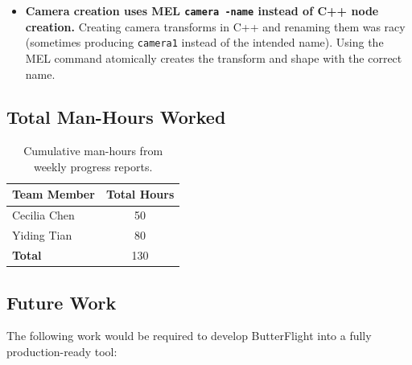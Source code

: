 \documentclass[12pt]{article}
\begin{document}
\begin{itemize}
  \item \textbf{Camera creation uses MEL \texttt{camera -name} instead of
    C++ node creation.} Creating camera transforms in C++ and renaming them
    was racy (sometimes producing \texttt{camera1} instead of the intended
    name). Using the MEL command atomically creates the transform and shape
    with the correct name.
\end{itemize}


\subsection{Total Man-Hours Worked}

\begin{table}[H]
\centering
\begin{tabular}{|l|c|}
\hline
\textbf{Team Member} & \textbf{Total Hours} \\
\hline
Cecilia Chen  & 50 \\
Yiding Tian   & 80 \\
\hline
\textbf{Total} & 130 \\
\hline
\end{tabular}
\caption{Cumulative man-hours from weekly progress reports.}
\end{table}


\subsection{Future Work}

The following work would be required to develop ButterFlight into a fully
production-ready tool:
\end{document}
